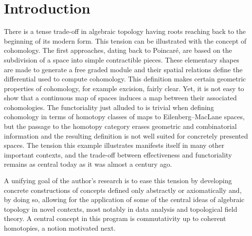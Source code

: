 \section*{Introduction} \label{s:introduction}

There is a tense trade-off in algebraic topology having roots reaching back to the beginning of its modern form.
This tension can be illustrated with the concept of cohomology.
The first approaches, dating back to Poincar\'e, are based on the subdivision of a space into simple contractible pieces.
These elementary shapes are made to generate a free graded module and their spatial relations define the differential used to compute cohomology.
This definition makes certain geometric properties of cohomology, for example excision, fairly clear.
Yet, it is not easy to show that a continuous map of spaces induces a map between their associated cohomologies.
The functoriality just alluded to is trivial when defining cohomology in terms of homotopy classes of maps to Eilenberg--MacLane spaces, but the passage to the homotopy category erases geometric and combinatorial information and the resulting definition is not well suited for concretely presented spaces.
The tension this example illustrates manifests itself in many other important contexts, and the trade-off between effectiveness and functoriality remains as central today as it was almost a century ago.

A unifying goal of the author's research is to ease this tension by developing concrete constructions of concepts defined only abstractly or axiomatically and, by doing so, allowing for the application of some of the central ideas of algebraic topology in novel contexts, most notably in data analysis and topological field theory.
A central concept in this program is commutativity up to coherent homotopies, a notion motivated next.

